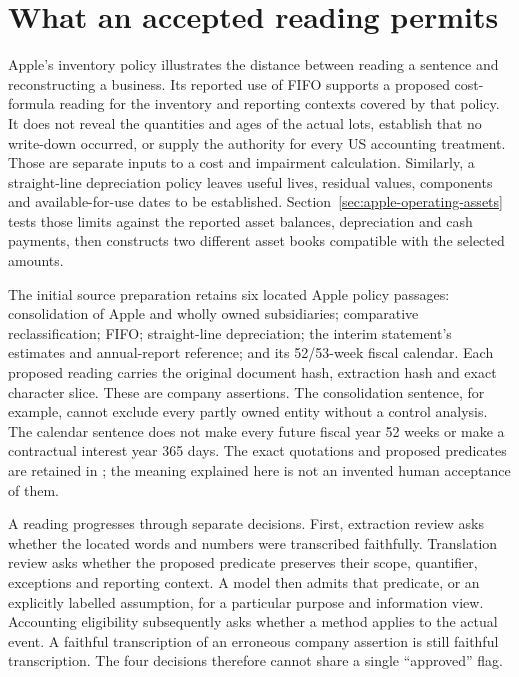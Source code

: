 \section{What an accepted reading permits}
\label{sec:source-admission}

Apple's inventory policy illustrates the distance between reading a sentence
and reconstructing a business. Its reported use of FIFO supports a proposed
cost-formula reading for the inventory and reporting contexts covered by that
policy. It does not reveal the quantities and ages of the actual lots, establish
that no write-down occurred, or supply the authority for every US accounting
treatment. Those are separate inputs to a cost and impairment calculation.
Similarly, a straight-line depreciation policy leaves useful lives, residual
values, components and available-for-use dates to be established.
Section~\ref{sec:apple-operating-assets} tests those limits against the reported
asset balances, depreciation and cash payments, then constructs two different
asset books compatible with the selected amounts.

The initial source preparation retains six located Apple policy passages: consolidation
of Apple and wholly owned subsidiaries; comparative reclassification; FIFO;
straight-line depreciation; the interim statement's estimates and annual-report
reference; and its 52/53-week fiscal calendar. Each proposed reading carries
the original document hash, extraction hash and exact character slice. These
are company assertions. The consolidation sentence, for example, cannot exclude
every partly owned entity without a control analysis. The calendar sentence
does not make every future fiscal year 52 weeks or make a contractual interest
year 365 days. The exact quotations and proposed predicates are retained in
; the meaning explained here is
not an invented human acceptance of them.

A reading progresses through separate decisions. First, extraction review asks
whether the located words and numbers were transcribed faithfully. Translation
review asks whether the proposed predicate preserves their scope, quantifier,
exceptions and reporting context. A model then admits that predicate, or an
explicitly labelled assumption, for a particular purpose and information view.
Accounting eligibility subsequently asks whether a method applies to the actual
event. A faithful transcription of an erroneous company assertion is still
faithful transcription. The four decisions therefore cannot share a single
``approved'' flag.

